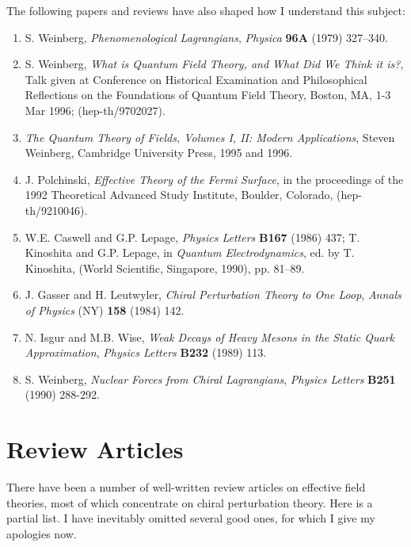 \documentclass[12pt,epsf]{report}
\begin{document}
The following papers and reviews have also shaped how I
understand this subject:

\begin{enumerate}

\item
S. Weinberg, {\sl Phenomenological Lagrangians}, {\it
Physica} {\bf 96A} (1979) 327--340.

\item S. Weinberg, {\sl What is Quantum Field Theory, and
What Did We Think it is?}, Talk given at Conference on
Historical Examination and Philosophical Reflections on the
Foundations of Quantum Field Theory, Boston, MA, 1-3 Mar
1996; (hep-th/9702027).

\item
{\it The Quantum Theory of Fields, Volumes I,  II: Modern
Applications}, Steven Weinberg, Cambridge University Press,
1995 and 1996.

\item
J. Polchinski, {\sl  Effective Theory of the Fermi
Surface}, in the proceedings of the 1992 Theoretical
Advanced Study Institute, Boulder, Colorado,
(hep-th/9210046).

\item
W.E. Caswell and G.P. Lepage, {\it Physics Letters} {\bf
B167} (1986)  437; T. Kinoshita and G.P. Lepage, in {\it
Quantum Electrodynamics}, ed. by T. Kinoshita, (World
Scientific, Singapore, 1990), pp.  81--89.

\item
J. Gasser and H. Leutwyler, {\sl Chiral Perturbation Theory
to One Loop}, {\it Annals of Physics} (NY) {\bf 158} (1984)
142. 

\item
N. Isgur and M.B. Wise, {\sl Weak Decays of Heavy Mesons in
the Static Quark Approximation}, {\it Physics Letters} {\bf
B232} (1989) 113.

\item
S. Weinberg, {\sl Nuclear Forces from Chiral Lagrangians},
{\it Physics Letters} {\bf B251} (1990) 288-292.

\end{enumerate}

\section{Review Articles}

There have been a number of well-written review articles on
effective field theories, most of which concentrate on
chiral perturbation theory. Here is a partial list. I have
inevitably omitted several good ones, for which I give my
apologies now.
\end{document}
